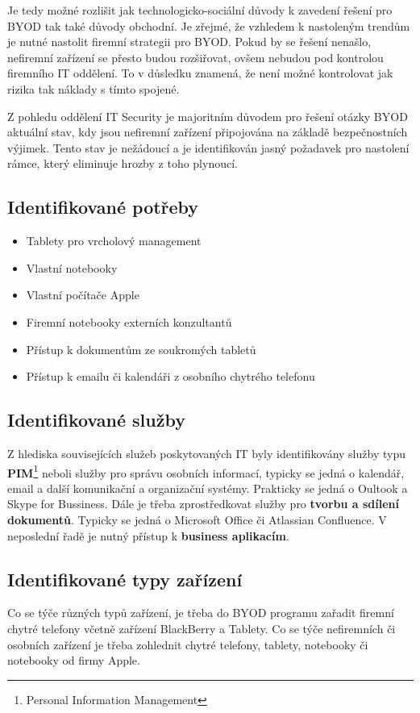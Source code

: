 Je tedy možné rozlišit jak technologicko-sociální důvody k zavedení řešení pro BYOD tak také důvody obchodní. Je zřejmé, že vzhledem k nastoleným trendům je nutné nastolit firemní strategii pro BYOD. Pokud by se řešení nenašlo, nefiremní zařízení se přesto budou rozšiřovat, ovšem nebudou pod kontrolou firemního IT oddělení. To v důsledku znamená, že není možné kontrolovat jak rizika tak náklady s tímto spojené. 

Z pohledu oddělení IT Security je majoritním důvodem pro řešení otázky BYOD aktuální stav, kdy jsou nefiremní zařízení připojována na základě bezpečnostních výjimek. Tento stav je nežádoucí a je identifikován jasný požadavek pro nastolení rámce, který eliminuje hrozby z toho plynoucí.


\subsection{Identifikované potřeby}\label{identifikovanePotreby}
\begin{itemize}
    \item Tablety pro vrcholový management
    \item Vlastní notebooky
    \item Vlastní počítače Apple
    \item Firemní notebooky externích konzultantů
    \item Přístup k dokumentům ze soukromých tabletů
    \item Přístup k emailu či kalendáři z osobního chytrého telefonu
\end{itemize}

\subsection{Identifikované služby}\label{identifikovaneSluyby}
Z hlediska souvisejících služeb poskytovaných IT byly identifikovány služby typu \textbf{PIM}\footnote{Personal Information Management} neboli služby pro správu osobních informací, typicky se jedná o kalendář, email a další komunikační a organizační systémy. Prakticky se jedná o Oultook a Skype for Bussiness. Dále je třeba zprostředkovat služby pro \textbf{tvorbu a sdílení dokumentů}. Typicky se jedná o Microsoft Office či Atlassian Confluence. V neposlední řadě je nutný přístup k \textbf{business aplikacím}.

\subsection{Identifikované typy zařízení}
Co se týče různých typů zařízení, je třeba do BYOD programu zařadit firemní chytré telefony včetně zařízení BlackBerry a Tablety. Co se týče nefiremních či osobních zařízení je třeba zohlednit chytré telefony, tablety, notebooky či notebooky od firmy Apple.

